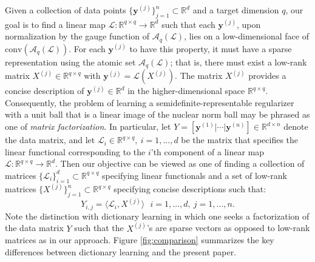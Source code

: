 \documentclass[11pt,letterpaper]{article}
\newcommand{\R}{\mathbb{R}}
\newcommand{\A}{\mathcal{A}}
\newcommand{\by}{\mathbf{y}}
\renewcommand{\L}{\mathcal{L}}
\begin{document}
Given a collection of data points $\{\by^{(j)}\}_{j=1}^n \subset \R^d$ and a target dimension $q$, our goal is to find a linear map $\L : \R^{q \times q} \rightarrow \R^d$ such that each $\by^{(j)}$, upon normalization by the gauge function of $\A_{q}(\L)$, lies on a low-dimensional face of $\mathrm{conv}(\A_{q}(\L))$.  For each $\by^{(j)}$ to have this property, it must have a sparse representation using the atomic set $\A_{q}(\L)$; that is, there must exist a low-rank matrix $X^{(j)} \in \R^{q \times q}$ with $\by^{(j)} = \L (X^{(j)})$.  The matrix $X^{(j)}$ provides a concise description of $\by^{(j)} \in \R^d$ in the higher-dimensional space $\R^{q \times q}$.  Consequently, the problem of learning a semidefinite-representable regularizer with a unit ball that is a linear image of the nuclear norm ball may be phrased as one of \emph{matrix factorization}.  In particular, let $Y = [\by^{(1)} | \cdots | \by^{(n)}] \in \R^{d \times n}$ denote the data matrix, and let $\L_{i} \in \R^{q \times q}, ~ i=1,\dots,d$ be the matrix that specifies the linear functional corresponding to the $i$'th component of a linear map $\L : \R^{q \times q} \rightarrow \R^d$.  Then our objective can be viewed as one of finding a collection of matrices $\{\L_{i}\}_{i=1}^d \subset \R^{q \times q}$ specifying linear functionals and a set of low-rank matrices $\{X^{(j)}\}_{j=1}^n \subset \R^{q \times q}$ specifying concise descriptions such that:
\begin{equation} 
Y_{i,j} = \langle \L_{i}, X^{(j)} \rangle ~~~ i=1,\dots,d, ~ j=1,\dots,n. \label{eq:lowrankfactor}
\end{equation}
Note the distinction with dictionary learning in which one seeks a factorization of the data matrix $Y$ such that the $X^{(j)}$'s are sparse vectors as opposed to low-rank matrices as in our approach.  Figure \ref{fig:comparison} summarizes the key differences between dictionary learning and the present paper.



\end{document}
